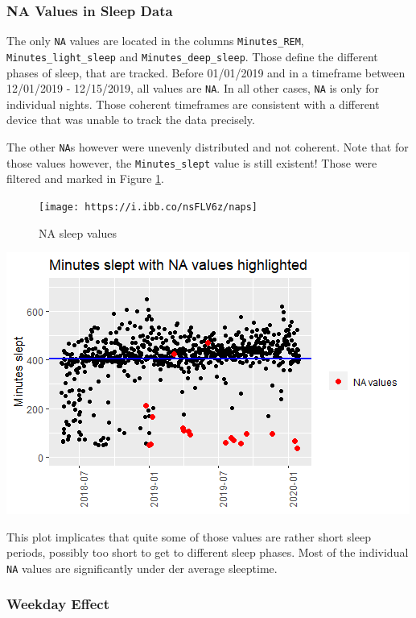 \documentclass[
]{article}
\begin{document}
\hypertarget{na-values-in-sleep-data}{%
\subsubsection{NA Values in Sleep Data}\label{na-values-in-sleep-data}}

The only \texttt{NA} values are located in the columns
\texttt{Minutes\_REM}, \texttt{Minutes\_light\_sleep} and
\texttt{Minutes\_deep\_sleep}. Those define the different phases of
sleep, that are tracked. Before 01/01/2019 and in a timeframe between
12/01/2019 - 12/15/2019, all values are \texttt{NA}. In all other cases,
\texttt{NA} is only for individual nights. Those coherent timeframes are
consistent with a different device that was unable to track the data
precisely.

The other \texttt{NA}s however were unevenly distributed and not
coherent. Note that for those values however, the
\texttt{Minutes\_slept} value is still existent! Those were filtered and
marked in Figure \ref{fig:na_sleep_values}.

\begin{figure}
\texttt{[image: https://i.ibb.co/nsFLV6z/naps]} \caption{NA sleep values}\label{fig:na_sleep_values}
\end{figure}

\includegraphics{./c73a3363277d31270c7c3c6fa489850fb4cfd40c.png}

This plot implicates that quite some of those values are rather short
sleep periods, possibly too short to get to different sleep phases. Most
of the individual \texttt{NA} values are significantly under der average
sleeptime.

\hypertarget{weekday-effect}{%
\subsubsection{Weekday Effect}\label{weekday-effect}}
\end{document}
